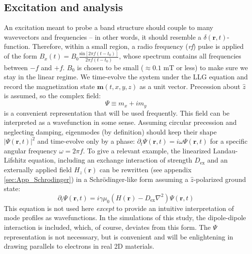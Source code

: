 \documentclass[aps,prx,twocolumn,superscriptaddress,floatfix]{revtex4-2}
\begin{document}
\subsection{Excitation and analysis}
An excitation meant to probe a band structure should couple to many wavevectors and frequencies -- in other words, it should resemble a $\delta(\mathbf{r},t)$-function. Therefore, within a small region, a radio frequency ({\em rf}) pulse is applied of the form $B_x(t)=B_0\frac{\text{sin}\left[2\pi f(t-t_0)\right]}{2\pi f(t-t_0)}$, whose spectrum contains all frequencies between $-f$ and $+f$. $B_0$ is chosen to be small ($ \approx 0.1 \text{ mT}$ or less) to make sure we stay in the linear regime. We time-evolve the system under the LLG equation and record the magnetization state $\mathbf{m}(t,x,y,z)$ as a unit vector. Precession about $\hat{z}$ is assumed, so the complex field:
\begin{equation}
    \Psi\equiv m_x+im_y
\end{equation}
 is a convenient representation that will be used frequently. This field can be interpreted as a wavefunction in some sense. Assuming circular precession and neglecting damping, eigenmodes (by definition) should keep their shape $|\Psi(\mathbf{r},t)|^2$ and time-evolve only by a phase:  $\partial_t \Psi(\mathbf{r},t)=i\omega \Psi(\mathbf{r},t)$ for a specific angular frequency $\omega=2\pi f$. To give a relevant example, the linearized Landau-Lifshitz equation, including an exchange interaction of strength $D_{\text{ex}}$ and an externally applied field $H_z(\mathbf{r})$ can be rewritten (see appendix \ref{sec:App_Schrodinger}) in a Schr{\"o}dinger-like form assuming a $\hat{z}$-polarized ground state\cite{landau_magnetism_nodate, herring_theory_1951, lim_ferromagnetic_2021}:
\begin{equation}
 \partial_t\Psi(\mathbf{r},t)=i\gamma  \mu_0\left(H(\mathbf{r})-D_{\text{ex}}\nabla^2\right) \Psi(\mathbf{r},t)
\label{eq:Schrodinger-like}
\end{equation}
This equation is not used here \textit{except} to provide an intuitive interpretation of mode profiles as wavefunctions. In the simulations of this study, the dipole-dipole interaction is included, which, of course, deviates from this form. The $\Psi$ representation is not necesssary, but is convenient and will be enlightening in drawing parallels to electrons in real 2D materials.
\end{document}
